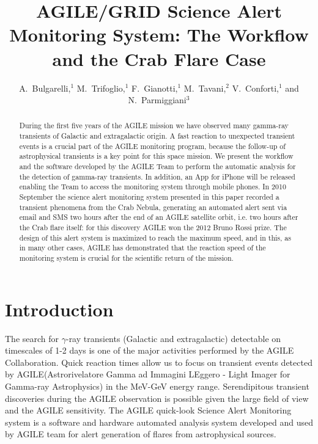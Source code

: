 
\resetcounters


\title{AGILE/GRID Science Alert Monitoring System: The Workflow and the Crab Flare Case}
\author{A.~Bulgarelli,$^1$ M.~Trifoglio,$^1$ F.~Gianotti,$^1$ 
M.~Tavani,$^2$ V.~Conforti,$^1$ and N.~Parmiggiani$^3$
}


\begin{abstract}
During the first five years of the AGILE mission we have observed many gamma-ray transients of Galactic and extragalactic origin. A fast reaction to unexpected transient events is a crucial part of the AGILE monitoring program, because the follow-up of astrophysical transients is a key point for this space mission. We present the workflow and the software developed by the AGILE Team to perform the automatic analysis  for the detection of gamma-ray transients. In addition, an App for iPhone will be released enabling the  Team to access the monitoring system through mobile phones. In 2010 September the science alert monitoring system presented in this paper recorded a transient phenomena from the Crab Nebula, generating an automated alert sent via email and SMS two hours after the end of an AGILE satellite orbit, i.e. two hours after the Crab flare itself: for this discovery AGILE won the 2012 Bruno Rossi prize. The design of this alert system is maximized to reach the maximum speed, and in this, as in many other cases, AGILE has demonstrated that the reaction speed of the monitoring system is crucial for the scientific return of the mission. 
\end{abstract}

\section{Introduction}
The search for $\gamma$-ray transients (Galactic and extragalactic) detectable on timescales of 1-2 days is one of the major activities performed by the AGILE Collaboration. Quick reaction times allow us to focus on transient events detected by AGILE(Astrorivelatore Gamma ad Immagini LEggero - Light Imager for Gamma-ray Astrophysics) in the MeV-GeV energy range. Serendipitous transient discoveries during the AGILE observation is possible given the large field of view and the AGILE sensitivity. The AGILE quick-look Science Alert Monitoring system  is a software and hardware automated analysis system developed and used by AGILE team for alert generation of flares from astrophysical sources.

